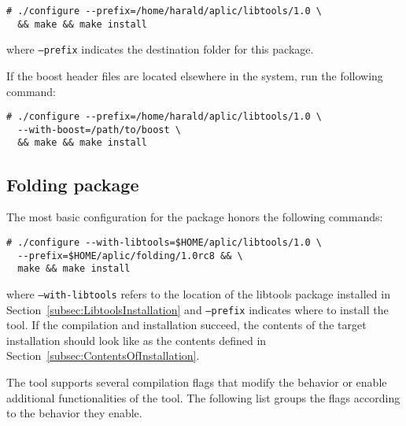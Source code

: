 \begin{verbatim}
# ./configure --prefix=/home/harald/aplic/libtools/1.0 \
  && make && make install
\end{verbatim}

where \texttt{--prefix} indicates the destination folder for this package.

If the boost header files are located elsewhere in the system, run the following command:

\begin{verbatim}
# ./configure --prefix=/home/harald/aplic/libtools/1.0 \
  --with-boost=/path/to/boost \
  && make && make install
\end{verbatim}

\subsection{Folding package}

The most basic configuration for the \FOLDING package honors the following commands:

\begin{verbatim}
# ./configure --with-libtools=$HOME/aplic/libtools/1.0 \
  --prefix=$HOME/aplic/folding/1.0rc8 && \
  make && make install
\end{verbatim}

where \texttt{--with-libtools} refers to the location of the libtools package installed in Section~\ref{subsec:LibtoolsInstallation} and \texttt{--prefix} indicates where to install the \FOLDING tool.
If the compilation and installation succeed, the contents of the target installation should look like as the contents defined in Section~\ref{subsec:ContentsOfInstallation}.

The \FOLDING tool supports several compilation flags that modify the behavior or enable additional functionalities of the tool.
The following list groups the flags according to the behavior they enable.

